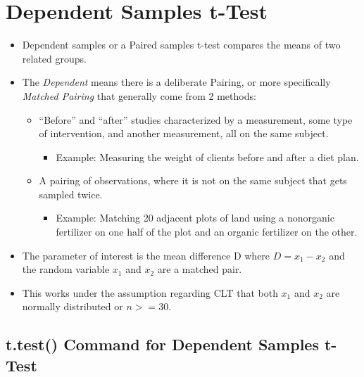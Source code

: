 \documentclass[
  letterpaper,
  DIV=11,
  numbers=noendperiod]{scrreprt}
\providecommand{\tightlist}{%
  \setlength{\itemsep}{0pt}\setlength{\parskip}{0pt}}\usepackage{longtable,booktabs,array}
\begin{document}

\chapter{Dependent Samples t-Test}\label{dependent-samples-t-test}

\begin{itemize}
\tightlist
\item
  Dependent samples or a Paired samples t-test compares the means of two
  related groups.
\item
  The \emph{Dependent} means there is a deliberate Pairing, or more
  specifically \emph{Matched Pairing} that generally come from 2
  methods:

  \begin{itemize}
  \tightlist
  \item
    ``Before'' and ``after'' studies characterized by a measurement,
    some type of intervention, and another measurement, all on the same
    subject.

    \begin{itemize}
    \tightlist
    \item
      Example: Measuring the weight of clients before and after a diet
      plan.
    \end{itemize}
  \item
    A pairing of observations, where it is not on the same subject that
    gets sampled twice.

    \begin{itemize}
    \tightlist
    \item
      Example: Matching 20 adjacent plots of land using a nonorganic
      fertilizer on one half of the plot and an organic fertilizer on
      the other.
    \end{itemize}
  \end{itemize}
\item
  The parameter of interest is the mean difference D where
  \(D = x_1 - x_2\) and the random variable \(x_1\) and \(x_2\) are a
  matched pair.
\item
  This works under the assumption regarding CLT that both \(x_1\) and
  \(x_2\) are normally distributed or \(n >= 30\).
\end{itemize}

\section{t.test() Command for Dependent Samples
t-Test}\label{t.test-command-for-dependent-samples-t-test}
\end{document}
